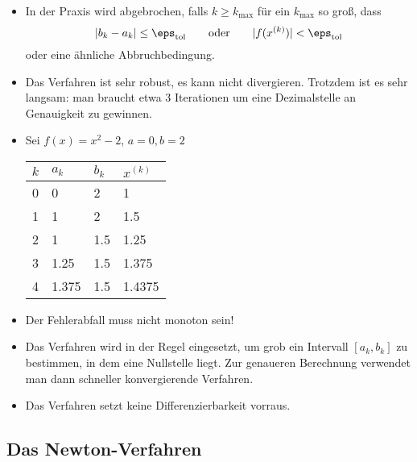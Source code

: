 \documentclass[11pt]{scrbook}
\begin{document}
\begin{nt*}
	\begin{itemize}
		\item
			In der Praxis wird abgebrochen, falls $k \ge k_{\text{max}}$ für ein $k_{\text{max}}$ so groß, dass
			\[
				|b_k -a_k| \le \eps_{\text{tol}}
				\qquad
				\text{oder}
				\qquad
				|f(x^{(k)})| < \eps_{\text{tol}}
			\]
			oder eine ähnliche Abbruchbedingung.
		\item
			Das Verfahren ist sehr robust, es kann nicht divergieren.
			Trotzdem ist es sehr langsam: man braucht etwa 3 Iterationen um eine Dezimalstelle an Genauigkeit zu gewinnen.
		\item
			Sei $f(x) = x^2 - 2$, $a=0, b=2$
			\begin{table}[!ht]
				\centering
				\begin{tabular}{c|l|l|l}
					$k$ & $a_k$ & $b_k$ & $x^{(k)}$ \\ \hline
					0 & 0 & 2 & 1 \\
					1 & 1 & 2 & 1.5 \\
					2 & 1 & 1.5 & 1.25 \\
					3 & 1.25 & 1.5 & 1.375 \\
					4 & 1.375 & 1.5 & 1.4375 
				\end{tabular}
			\end{table}
		\item
			Der Fehlerabfall muss nicht monoton sein!
		\item
			Das Verfahren wird in der Regel eingesetzt, um grob ein Intervall $[a_k,b_k]$ zu bestimmen, in dem eine Nullstelle liegt.
			Zur genaueren Berechnung verwendet man dann schneller konvergierende Verfahren.
		\item
			Das Verfahren setzt keine Differenzierbarkeit vorraus.
	\end{itemize}
\end{nt*}

\subsection{Das Newton-Verfahren}
\end{document}
